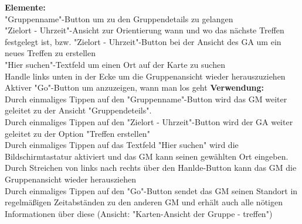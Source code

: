\textbf{Elemente:}\\
"Gruppenname"-Button um zu den Gruppendetails zu gelangen\\
"Zielort - Uhrzeit"-Ansicht zur Orientierung wann und wo das nächste Treffen festgelegt ist, bzw. "Zielort - Uhrzeit"-Button bei der Ansicht des GA um ein neues Treffen zu erstellen\\
"Hier suchen"-Textfeld um einen Ort auf der Karte zu suchen\\
Handle links unten in der Ecke um die Gruppenansicht wieder herauszuziehen\\
Aktiver "Go"-Button um anzuzeigen, wann man los geht
\textbf{Verwendung:}\\
Durch einmaliges Tippen auf den "Gruppenname"-Button wird das GM weiter geleitet zu der Ansicht "Gruppendeteils".\\
Durch einmaliges Tippen auf den "Zielort - Uhrzeit"-Button wird der GA weiter geleitet zu der Option "Treffen erstellen"\\
Durch einmaliges Tippen auf das Textfeld "Hier suchen" wird die Bildschirmtastatur aktiviert und das GM kann seinen gewählten Ort eingeben.\\
Durch Streichen von links nach rechts über den Hanlde-Button kann das GM die Gruppenansicht wieder herausziehen\\
Durch einmaliges Tippen auf den "Go"-Button sendet das GM seinen Standort in regelmäßigen Zeitabständen zu den anderen GM und erhält auch alle nötigen Informationen über diese (Ansicht: "Karten-Ansicht der Gruppe - treffen")\\ \\

